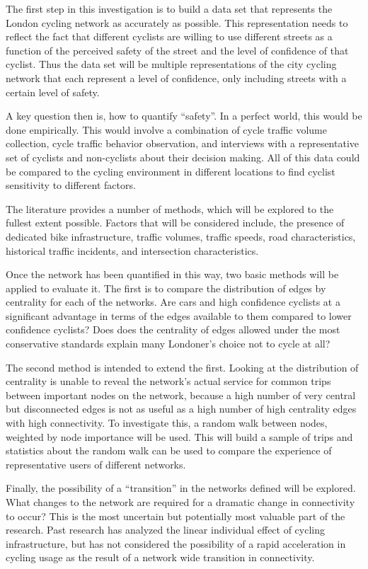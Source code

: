 \documentclass[11pt]{article} %
\begin{document}
The first step in this investigation is to build a data set that represents the London cycling network as accurately as possible. This representation needs to reflect the fact that different cyclists are willing to use different streets as a function of the perceived safety of the street and the level of confidence of that cyclist. Thus the data set will be multiple representations of the city cycling network that each represent a level of confidence, only including streets with a certain level of safety. 

A key question then is, how to quantify ``safety''. In a perfect world, this would be done empirically. This would involve a combination of cycle traffic volume collection, cycle traffic behavior observation, and interviews with a representative set of cyclists and non-cyclists about their decision making. All of this data could be compared to the cycling environment in different locations to find cyclist sensitivity to different factors.  

The literature provides a number of methods, which will be explored to the fullest extent possible. Factors that will be considered include, the presence of dedicated bike infrastructure, traffic volumes, traffic speeds, road characteristics, historical traffic incidents, and intersection characteristics. 

Once the network has been quantified in this way, two basic methods will be applied to evaluate it. The first is to compare the distribution of edges by centrality for each of the networks. Are cars and high confidence cyclists at a significant advantage in terms of the edges available to them compared to lower confidence cyclists? Does does the centrality of edges allowed under the most conservative standards explain many Londoner's choice not to cycle at all? 

The second method is intended to extend the first. Looking at the distribution of centrality is unable to reveal the network's actual service for common trips between important nodes on the network, because a high number of very central but disconnected edges is not as useful as a high number of high centrality edges with high connectivity. To investigate this, a random walk between nodes, weighted by node importance will be used. This will build a sample of trips and statistics about the random walk can be used to compare the experience of representative users of different networks. 

Finally, the possibility of a ``transition'' in the networks defined will be explored. What changes to the network are required for a dramatic change in connectivity to occur? This is the most uncertain but potentially most valuable part of the research. Past research has analyzed the linear individual effect of cycling infrastructure, but has not considered the possibility of a rapid acceleration in cycling usage as the result of a network wide transition in connectivity. 
\end{document}
